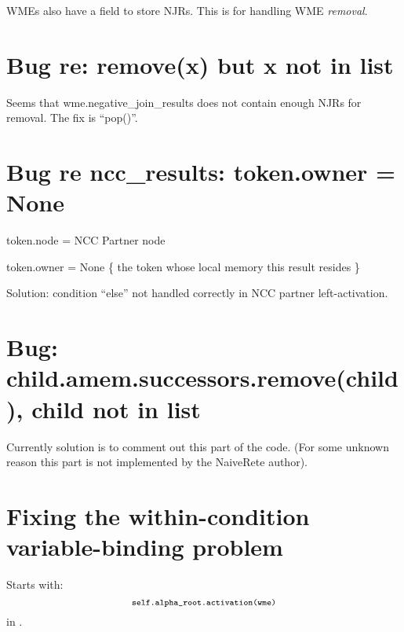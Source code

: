 WMEs also have a field to store NJRs.  This is for handling WME \textit{removal}.

\section{Bug re: remove(x) but x not in list}

Seems that wme.negative\_join\_results does not contain enough NJRs for removal.  The fix is ``pop()''.

\section{Bug re ncc\_results: token.owner = None}

token.node = NCC Partner node

token.owner = None \hspace{2cm} \{ the token whose local memory this result resides \}

Solution: condition ``else'' not handled correctly in NCC partner left-activation.

\section{Bug: child.amem.successors.remove(child), child not in list}

Currently solution is to comment out this part of the code.  (For some unknown reason this part is not implemented by the NaiveRete author).

\section{Fixing the within-condition variable-binding problem}

Starts with:
\begin{equation}
{\footnotesize
\verb! self.alpha_root.activation(wme) !
}
\end{equation}
in .


